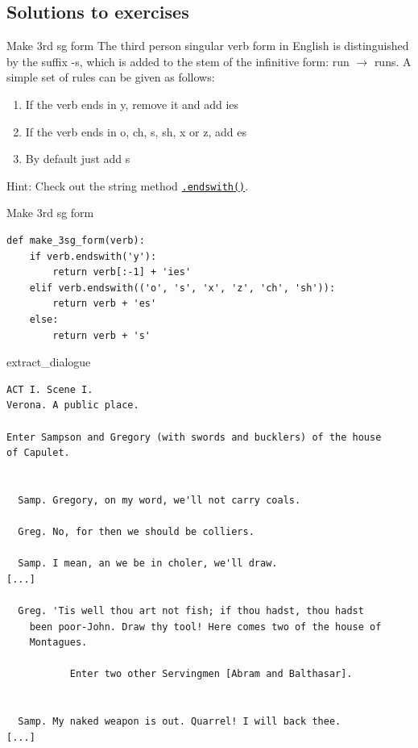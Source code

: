 \documentclass[aspectratio=169,usenames,dvipsnames]{beamer}
\begin{document}
\subsection{Solutions to exercises}
\begin{frame}{Make 3rd sg form}
The third person singular verb form in English is distinguished by the suffix
-s, which is added to the stem of the infinitive form: run $\rightarrow$ runs.
A simple set of rules can be given as follows:
\begin{enumerate}
    \item If the verb ends in y, remove it and add ies
    \item If the verb ends in o, ch, s, sh, x or z, add es
    \item By default just add s
\end{enumerate}

\vspace{1em}
Hint: Check out the string method \href{https://docs.python.org/3/library/stdtypes.html\#str.endswith}{\lstinline{.endswith()}}.
\end{frame}

\begin{frame}[fragile]{Make 3rd sg form}
\begin{lstlisting}
def make_3sg_form(verb):
    if verb.endswith('y'):
        return verb[:-1] + 'ies'
    elif verb.endswith(('o', 's', 'x', 'z', 'ch', 'sh')):
        return verb + 'es'
    else:
        return verb + 's'
\end{lstlisting}
\end{frame}


\begin{frame}[fragile]{extract\_dialogue}
\scriptsize
\begin{verbatim}
ACT I. Scene I.
Verona. A public place.

Enter Sampson and Gregory (with swords and bucklers) of the house
of Capulet.


  Samp. Gregory, on my word, we'll not carry coals.

  Greg. No, for then we should be colliers.

  Samp. I mean, an we be in choler, we'll draw.
[...]

  Greg. 'Tis well thou art not fish; if thou hadst, thou hadst
    been poor-John. Draw thy tool! Here comes two of the house of
    Montagues.

           Enter two other Servingmen [Abram and Balthasar].


  Samp. My naked weapon is out. Quarrel! I will back thee.
[...]
\end{verbatim}
\end{frame}
\end{document}
